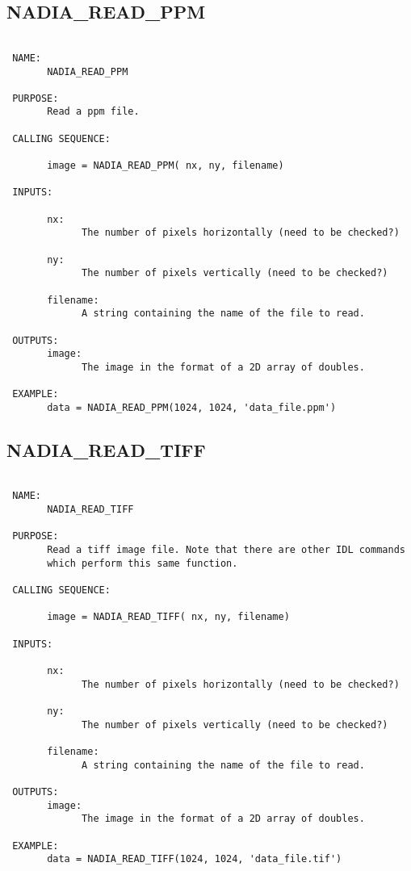   
 
\subsection{NADIA\_READ\_PPM}
\begin{verbatim}

 NAME:
       NADIA_READ_PPM

 PURPOSE:
       Read a ppm file.

 CALLING SEQUENCE:

       image = NADIA_READ_PPM( nx, ny, filename)

 INPUTS:

       nx:
             The number of pixels horizontally (need to be checked?)

       ny:
             The number of pixels vertically (need to be checked?)

       filename:
             A string containing the name of the file to read.

 OUTPUTS:
       image:
             The image in the format of a 2D array of doubles.

 EXAMPLE:
       data = NADIA_READ_PPM(1024, 1024, 'data_file.ppm')

\end{verbatim}






  
 
\subsection{NADIA\_READ\_TIFF}
\begin{verbatim}

 NAME:
       NADIA_READ_TIFF

 PURPOSE:
       Read a tiff image file. Note that there are other IDL commands
       which perform this same function.

 CALLING SEQUENCE:

       image = NADIA_READ_TIFF( nx, ny, filename)

 INPUTS:

       nx:
             The number of pixels horizontally (need to be checked?)

       ny:
             The number of pixels vertically (need to be checked?)

       filename:
             A string containing the name of the file to read.

 OUTPUTS:
       image:
             The image in the format of a 2D array of doubles.

 EXAMPLE:
       data = NADIA_READ_TIFF(1024, 1024, 'data_file.tif')

\end{verbatim}







